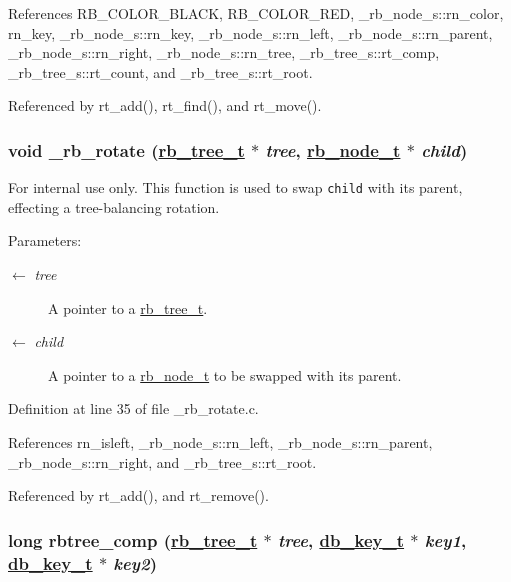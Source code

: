 References RB\_\-COLOR\_\-BLACK, RB\_\-COLOR\_\-RED, \_\-rb\_\-node\_\-s::rn\_\-color, rn\_\-key, \_\-rb\_\-node\_\-s::rn\_\-key, \_\-rb\_\-node\_\-s::rn\_\-left, \_\-rb\_\-node\_\-s::rn\_\-parent, \_\-rb\_\-node\_\-s::rn\_\-right, \_\-rb\_\-node\_\-s::rn\_\-tree, \_\-rb\_\-tree\_\-s::rt\_\-comp, \_\-rb\_\-tree\_\-s::rt\_\-count, and \_\-rb\_\-tree\_\-s::rt\_\-root.

Referenced by rt\_\-add(), rt\_\-find(), and rt\_\-move().\hypertarget{group__dbprim__rbtree_ga16}{
\subsubsection[\_\-rb\_\-rotate]{\setlength{\rightskip}{0pt plus 5cm}void \_\-rb\_\-rotate (\hyperlink{struct__rb__tree__s}{rb\_\-tree\_\-t} $\ast$ {\em tree}, \hyperlink{struct__rb__node__s}{rb\_\-node\_\-t} $\ast$ {\em child})}}
\label{group__dbprim__rbtree_ga16}


\begin{Desc}
\item[For internal use only.]
This function is used to swap {\tt child} with its parent, effecting a tree-balancing rotation.

\begin{Desc}
\item[Parameters:]
\begin{description}
\item[\mbox{$\leftarrow$} {\em tree}]A pointer to a \hyperlink{group__dbprim__rbtree_ga0}{rb\_\-tree\_\-t}. \item[\mbox{$\leftarrow$} {\em child}]A pointer to a \hyperlink{group__dbprim__rbtree_ga1}{rb\_\-node\_\-t} to be swapped with its parent.\end{description}
\end{Desc}
\end{Desc}


Definition at line 35 of file \_\-rb\_\-rotate.c.

References rn\_\-isleft, \_\-rb\_\-node\_\-s::rn\_\-left, \_\-rb\_\-node\_\-s::rn\_\-parent, \_\-rb\_\-node\_\-s::rn\_\-right, and \_\-rb\_\-tree\_\-s::rt\_\-root.

Referenced by rt\_\-add(), and rt\_\-remove().\hypertarget{group__dbprim__rbtree_ga5}{
\subsubsection[rbtree\_\-comp]{\setlength{\rightskip}{0pt plus 5cm}long rbtree\_\-comp (\hyperlink{struct__rb__tree__s}{rb\_\-tree\_\-t} $\ast$ {\em tree}, \hyperlink{struct__db__key__s}{db\_\-key\_\-t} $\ast$ {\em key1}, \hyperlink{struct__db__key__s}{db\_\-key\_\-t} $\ast$ {\em key2})}}
\label{group__dbprim__rbtree_ga5}


